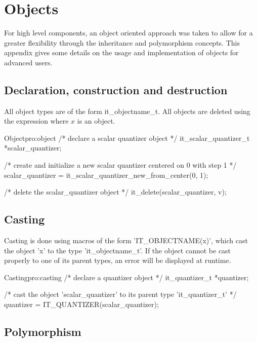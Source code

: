 \chapter{Objects}
\label{cha:objects}

    For high level components, an object oriented approach was taken to
    allow for a greater flexibility through the inheritance and polymorphism
    concepts. This appendix gives some details on the usage and implementation
    of objects for advanced users.

\section{Declaration, construction and destruction}
\label{sec:declaration}

  All object types are of the form it\_objectname\_t. All objects are
  deleted using the expression  where $x$ is an object.

\begin{program}{Object}{pro:object}
/* declare a scalar quantizer object */
it_scalar_quantizer_t *scalar_quantizer; 

/* create and initialize a new scalar quantizer centered on 0 with step 1 */
scalar_quantizer = it_scalar_quantizer_new_from_center(0, 1);

/* delete the scalar_quantizer object */
it_delete(scalar_quantizer, v);
\end{program}


\section{Casting}
\label{sec:casting}

     Casting is done using macros of the form 'IT\_OBJECTNAME(x)',
     which cast the object 'x' to the type 'it\_objectname\_t'. If the
     object cannot be cast properly to one of its parent types, an
     error will be displayed at runtime.

\begin{program}{Casting}{pro:casting}
/* declare a quantizer object */
it_quantizer_t *quantizer; 

/* cast the object 'scalar_quantizer' to its parent type 'it_quantizer_t' */
quantizer = IT_QUANTIZER(scalar_quantizer);
\end{program}


\section{Polymorphism}
\label{sec:polymorphism}

